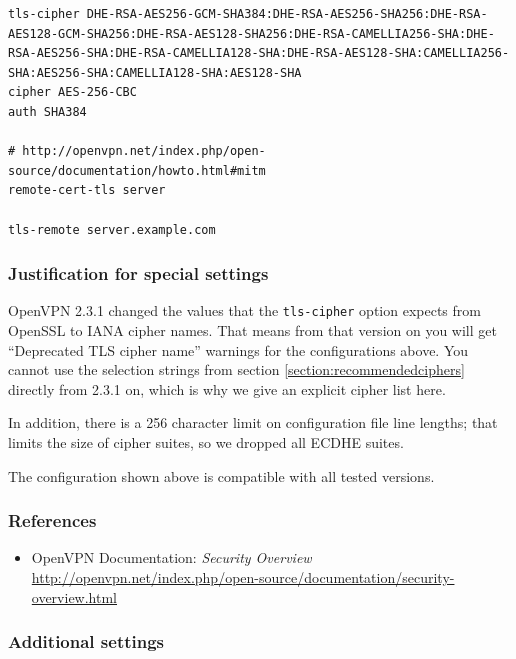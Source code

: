 \begin{lstlisting}
tls-cipher DHE-RSA-AES256-GCM-SHA384:DHE-RSA-AES256-SHA256:DHE-RSA-AES128-GCM-SHA256:DHE-RSA-AES128-SHA256:DHE-RSA-CAMELLIA256-SHA:DHE-RSA-AES256-SHA:DHE-RSA-CAMELLIA128-SHA:DHE-RSA-AES128-SHA:CAMELLIA256-SHA:AES256-SHA:CAMELLIA128-SHA:AES128-SHA
cipher AES-256-CBC
auth SHA384

# http://openvpn.net/index.php/open-source/documentation/howto.html#mitm
remote-cert-tls server

tls-remote server.example.com
\end{lstlisting}

\subsubsection{Justification for special settings}
OpenVPN 2.3.1 changed the values that the \verb|tls-cipher| option
expects from OpenSSL to IANA cipher names. That means from that
version on you will get ``Deprecated TLS cipher name'' warnings for
the configurations above. You cannot use the selection strings from
section \ref{section:recommendedciphers} directly from 2.3.1 on, which
is why we give an explicit cipher list here.

In addition, there is a 256 character limit on configuration file line
lengths; that limits the size of cipher suites, so we dropped all
ECDHE suites.

The configuration shown above is compatible with all tested versions.


\subsubsection{References}
\begin{itemize}
  \item OpenVPN Documentation: \emph{Security Overview} \url{http://openvpn.net/index.php/open-source/documentation/security-overview.html}
\end{itemize}



\subsubsection{Additional settings}

